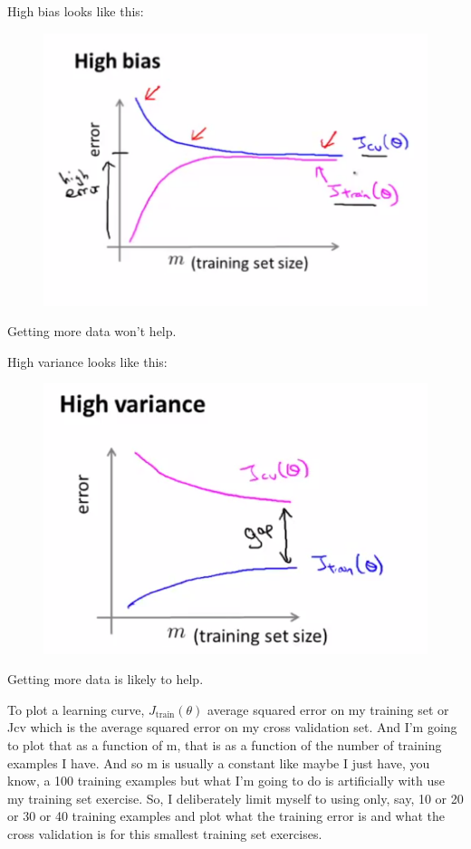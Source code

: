 \documentclass[fontsize=11]{article}
\begin{document}
High bias looks like this:
\begin{figure}
\includegraphics[scale=1]{./figures/high_bias.png}
\end{figure}

Getting more data won't help.

High variance looks like this:
\begin{figure}
\includegraphics[scale=1]{./figures/high_variance.png}
\end{figure}

Getting more data is likely to help.

 To plot a learning curve, $J_{\mathrm{train}}(\theta)$ average squared error on my training
 set or Jcv which is
 the average squared error on my cross validation set.
 And I'm going to plot
 that as a function
 of m, that is as a function
 of the number of training examples I have.
 And so m is usually a constant like maybe I just have, you know, a 100
 training examples but what I'm
 going to do is artificially with
 use my training set exercise. So, I
 deliberately limit myself to using only,
 say, 10 or 20 or
 30 or 40 training examples and
 plot what the training error is and
 what the cross validation is for this
 smallest training set exercises. 
 
\end{document}
